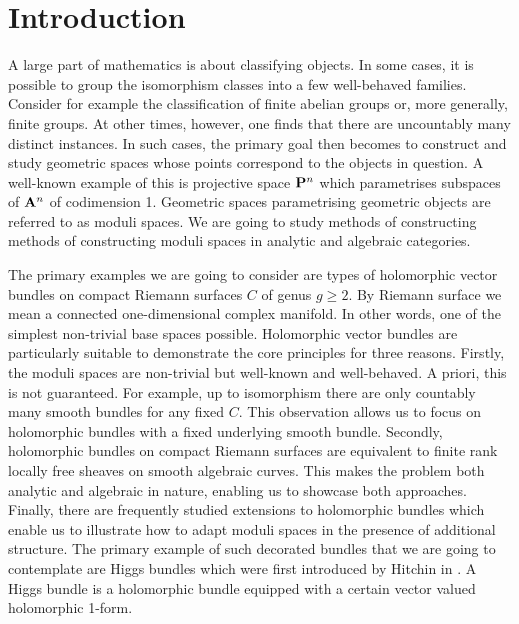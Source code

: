 \documentclass[12pt]{ociamthesis}  %
\begin{document}
\begin{romanpages}          %
  \tableofcontents            %
\end{romanpages}            %

\chapter{Introduction}

A large part of mathematics is about classifying objects. In some cases,
it is possible to group the isomorphism classes into a few well-behaved
families. Consider for example the classification of finite abelian
groups or, more generally, finite groups. At other times, however, one
finds that there are uncountably many distinct instances. In such cases,
the primary goal then becomes to construct and study geometric spaces
whose points correspond to the objects in question. A well-known example
of this is projective space $\mathbf{P}^{n}_{}$ which parametrises
subspaces of $\mathbf{A}^{n}_{}$ of codimension 1. Geometric
spaces parametrising geometric objects are referred to as moduli spaces.
We are going to study methods of constructing methods of constructing
moduli spaces in analytic and algebraic categories.

The primary examples we are going to consider are types of holomorphic
vector bundles on compact Riemann surfaces $C$ of genus $g\geq 2$. By Riemann surface
we mean a connected one-dimensional complex manifold. In other words,
one of the simplest non-trivial base spaces possible. Holomorphic vector
bundles are particularly suitable to demonstrate the core principles
for three reasons. Firstly, the moduli spaces are non-trivial but
well-known and well-behaved. A priori, this is not guaranteed. For example, up to isomorphism there are only countably
many smooth bundles for any fixed $C$. This observation allows us to
focus on holomorphic bundles with a fixed underlying smooth bundle.
Secondly, holomorphic bundles on compact Riemann surfaces are equivalent
to finite rank locally free sheaves on smooth algebraic curves. This
makes the problem both analytic and algebraic in nature, enabling
us to showcase both approaches.
Finally, there are frequently studied extensions to holomorphic
bundles which enable us to illustrate how to adapt moduli spaces in the
presence of additional structure. The primary example of such decorated
bundles that we are going to contemplate are Higgs bundles which were
first introduced by Hitchin in \cite{hitchin1987}. A
Higgs bundle is a holomorphic bundle equipped with a certain
vector valued holomorphic 1-form.
\end{document}

